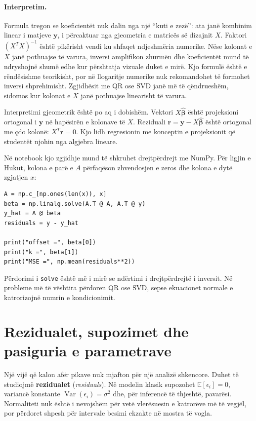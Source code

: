 \documentclass[12pt,a4paper,oneside]{book}
\newcommand{\term}[2]{\textbf{#1} (\textit{#2})}
\newcommand{\E}{\mathbb{E}}
\newcommand{\Var}{\operatorname{Var}}
\begin{document}
\paragraph{Interpretim.}
Formula tregon se koeficientët nuk dalin nga një ``kuti e zezë'': ata janë kombinim linear i matjeve $\mathbf y$, i përcaktuar nga gjeometria e matricës së dizajnit $X$. Faktori $(X^TX)^{-1}$ është pikërisht vendi ku shfaqet ndjeshmëria numerike. Nëse kolonat e $X$ janë pothuajse të varura, inversi amplifikon zhurmën dhe koeficientët mund të ndryshojnë shumë edhe kur përshtatja vizuale duket e mirë.
Kjo formulë është e rëndësishme teorikisht, por në llogaritje numerike nuk rekomandohet të formohet inversi shprehimisht. Zgjidhësit me QR ose SVD janë më të qëndrueshëm, sidomos kur kolonat e $X$ janë pothuajse linearisht të varura.

Interpretimi gjeometrik është po aq i dobishëm. Vektori $X\hat{\boldsymbol\beta}$ është projeksioni ortogonal i $\mathbf y$ në hapësirën e kolonave të $X$. Reziduali $\mathbf r=\mathbf y-X\hat{\boldsymbol\beta}$ është ortogonal me çdo kolonë: $X^T\mathbf r=0$. Kjo lidh regresionin me konceptin e projeksionit që studentët njohin nga algjebra lineare.

Në notebook kjo zgjidhje mund të shkruhet drejtpërdrejt me NumPy. Për ligjin e Hukut, kolona e parë e $A$ përfaqëson zhvendosjen e zeros dhe kolona e dytë zgjatjen $x$:
\begin{lstlisting}[caption={Regresioni linear nga parimet e para për matjet e ligjit të Hukut.}]
A = np.c_[np.ones(len(x)), x]
beta = np.linalg.solve(A.T @ A, A.T @ y)
y_hat = A @ beta
residuals = y - y_hat

print("offset =", beta[0])
print("k =", beta[1])
print("MSE =", np.mean(residuals**2))
\end{lstlisting}
Përdorimi i \texttt{solve} është më i mirë se ndërtimi i drejtpërdrejtë i inversit. Në probleme më të vështira përdoren QR ose SVD, sepse ekuacionet normale e katrorizojnë numrin e kondicionimit.

\section{Rezidualet, supozimet dhe pasiguria e parametrave}

Një vijë që kalon afër pikave nuk mjafton për një analizë shkencore. Duhet të studiojmë \term{rezidualet}{residuals}. Në modelin klasik supozohet $\E[\epsilon_i]=0$, variancë konstante $\Var(\epsilon_i)=\sigma^2$ dhe, për inferencë të thjeshtë, pavarësi. Normaliteti nuk është i nevojshëm për vetë vlerësuesin e katrorëve më të vegjël, por përdoret shpesh për intervale besimi ekzakte në mostra të vogla.
\end{document}
